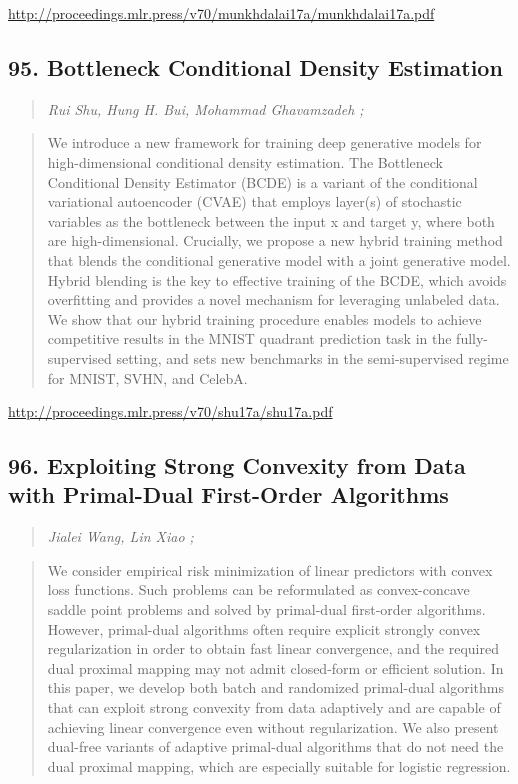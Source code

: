 \documentclass{article}
\begin{document}
\href{http://proceedings.mlr.press/v70/munkhdalai17a/munkhdalai17a.pdf}{http://proceedings.mlr.press/v70/munkhdalai17a/munkhdalai17a.pdf}

\subsection{95. Bottleneck Conditional Density Estimation}

\begin{quote}
\footnotesize{\textit{Rui Shu, Hung H. Bui, Mohammad Ghavamzadeh ;}}
\end{quote}

\begin{quote}
    We introduce a new framework for training deep generative models for high-dimensional conditional density estimation. The Bottleneck Conditional Density Estimator (BCDE) is a variant of the conditional variational autoencoder (CVAE) that employs layer(s) of stochastic variables as the bottleneck between the input x and target y, where both are high-dimensional. Crucially, we propose a new hybrid training method that blends the conditional generative model with a joint generative model. Hybrid blending is the key to effective training of the BCDE, which avoids overfitting and provides a novel mechanism for leveraging unlabeled data. We show that our hybrid training procedure enables models to achieve competitive results in the MNIST quadrant prediction task in the fully-supervised setting, and sets new benchmarks in the semi-supervised regime for MNIST, SVHN, and CelebA.  \end{quote}

\href{http://proceedings.mlr.press/v70/shu17a/shu17a.pdf}{http://proceedings.mlr.press/v70/shu17a/shu17a.pdf}

\subsection{96. Exploiting Strong Convexity from Data with Primal-Dual First-Order Algorithms}

\begin{quote}
\footnotesize{\textit{Jialei Wang, Lin Xiao ;}}
\end{quote}

\begin{quote}
    We consider empirical risk minimization of linear predictors with convex loss functions. Such problems can be reformulated as convex-concave saddle point problems and solved by primal-dual first-order algorithms. However, primal-dual algorithms often require explicit strongly convex regularization in order to obtain fast linear convergence, and the required dual proximal mapping may not admit closed-form or efficient solution. In this paper, we develop both batch and randomized primal-dual algorithms that can exploit strong convexity from data adaptively and are capable of achieving linear convergence even without regularization. We also present dual-free variants of adaptive primal-dual algorithms that do not need the dual proximal mapping, which are especially suitable for logistic regression.  \end{quote}
\end{document}
